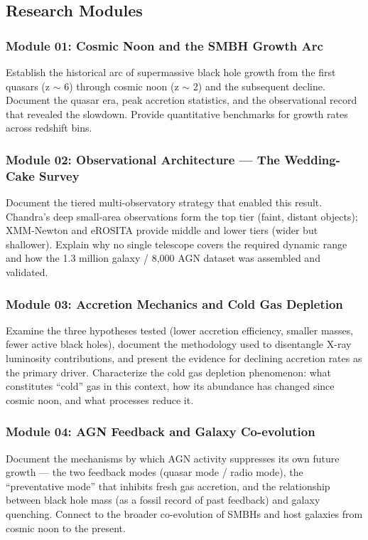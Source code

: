 \documentclass[11pt,letterpaper]{article}
\begin{document}
\subsection{Research Modules}

\subsubsection{Module 01: Cosmic Noon and the SMBH Growth Arc}

Establish the historical arc of supermassive black hole growth from the first quasars (z $\sim$ 6) through cosmic noon (z $\sim$ 2) and the subsequent decline. Document the quasar era, peak accretion statistics, and the observational record that revealed the slowdown. Provide quantitative benchmarks for growth rates across redshift bins.

\subsubsection{Module 02: Observational Architecture --- The Wedding-Cake Survey}

Document the tiered multi-observatory strategy that enabled this result. Chandra's deep small-area observations form the top tier (faint, distant objects); XMM-Newton and eROSITA provide middle and lower tiers (wider but shallower). Explain why no single telescope covers the required dynamic range and how the 1.3 million galaxy / 8,000 AGN dataset was assembled and validated.

\subsubsection{Module 03: Accretion Mechanics and Cold Gas Depletion}

Examine the three hypotheses tested (lower accretion efficiency, smaller masses, fewer active black holes), document the methodology used to disentangle X-ray luminosity contributions, and present the evidence for declining accretion rates as the primary driver. Characterize the cold gas depletion phenomenon: what constitutes ``cold'' gas in this context, how its abundance has changed since cosmic noon, and what processes reduce it.

\subsubsection{Module 04: AGN Feedback and Galaxy Co-evolution}

Document the mechanisms by which AGN activity suppresses its own future growth --- the two feedback modes (quasar mode / radio mode), the ``preventative mode'' that inhibits fresh gas accretion, and the relationship between black hole mass (as a fossil record of past feedback) and galaxy quenching. Connect to the broader co-evolution of SMBHs and host galaxies from cosmic noon to the present.
\end{document}

